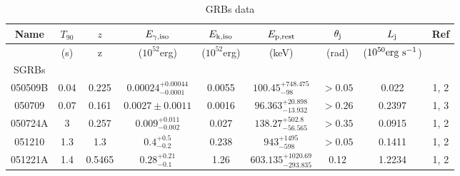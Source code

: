 \documentclass[a4paper,fleqn,usenatbib]{mnras}
\begin{document}
\begin{table*}
\centering
\caption{GRBs data}
{\footnotesize
\def\arraystretch{1.0}
\tabcolsep=6.6pt
\begin{tabular}[width=1.0 \linewidth]{ccccccccc}
\hline
\hline
Name & $T_{90}$ & $z$ & $E_{\rm \gamma,\rm iso}$ & $E_{\rm k,\rm iso}$ & $E_{\rm p,\rm rest}$ & $\theta_{\rm j}$ & $L_{\rm j}$ &  Ref  \\
\hline
  & (s) & z & ($10^{52}$\rm erg) & ($10^{52}$\rm erg) &(\rm keV) & (rad) & ($10^{50} \rm erg\rm~s^{-1}$) &  \\
\hline
SGRBs   \\
\hline
050509B  &	0.04 &	0.225 &	$0.00024_{-0.0001}^{+0.00044}$ &	0.0055 &	$100.45_{-98}^{+748.475}$  &	$ >0.05 $ &	0.022 &	1, 2 \\	 																																																																				050709  &	0.07 &	0.161 &	$0.0027\pm0.0011$ &	0.0016 &	$96.363_{-13.932}^{+20.898}$ &	$ >0.26 $ &	0.2397 &	1, 3 \\																																																																					050724A &	3 &	0.257 &	$0.009_{-0.002}^{+0.011}$ &	0.027  &	$138.27_{-56.565}^{+502.8}$ &	$ >0.35 $ &	0.0915 &	1, 2 \\																																																																					051210 &	1.3 &	1.3  &	$0.4_{-0.2}^{+0.5}$  &	0.238 &	$943_{-598}^{+1495}$ &	$>0.05$ &	0.1411 &	1, 2 \\																																																																		051221A &	1.4 &	0.5465 &	$0.28_{-0.1}^{+0.21}$ &	1.26  &	$603.135_{-293.835}^{+1020.69}$ &	0.12 &	1.2234 &	1, 2 \\

\end{tabular}}
\end{table*}
\end{document}
